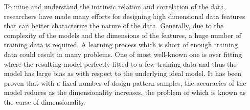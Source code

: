 \documentclass{iitthesis}
\begin{document}


To mine and understand the intrinsic relation and correlation of the data, researchers have made many efforts for designing high dimensional data features that can better characterize the nature of the data. Generally, due to the complexity of the models and the dimensions of the features, a huge number of training data is required\cite{RS:91, KHM:83}. A learning process which is short of enough training data could result in many problems. One of most well-known one is over fitting where the resulting model perfectly fitted to a few training data and thus the model has large bias as with respect to the underlying ideal model. It has been proven that with a fixed number of design pattern samples, the accuracies of the model reduces as the dimensionality increases\cite{HG:68}, the problem of which is known as the curse of dimensionality.
\end{document}
